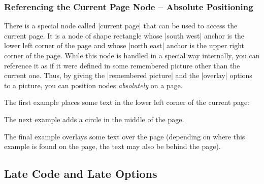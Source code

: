 \subsubsection{Referencing the Current Page Node -- Absolute Positioning}

There is a special node called |current page| that can be used to
access the current page. It is a node of shape rectangle whose
|south west| anchor is the lower left corner of the page and whose
|north east| anchor is the upper right corner of the page. While this
node is handled in a special way internally, you can reference it as
if it were defined in some remembered picture other than the current
one. Thus, by giving the |remembered picture| and the |overlay|
options to a picture, you can position nodes \emph{absolutely} on a
page.

The first example places some text in the lower left corner of the
current page:
\begin{codeexample}[]
\end{codeexample}

The next example adds a circle in the middle of the page.
\begin{codeexample}[]
\end{codeexample}

The final example overlays some text over the page (depending on where
this example is found on the page, the text may also be behind the
page).
\begin{codeexample}[]
\end{codeexample}



\subsection{Late Code and Late Options}

